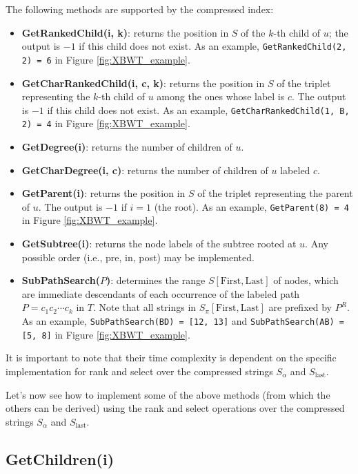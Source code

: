 The following methods are supported by the compressed index:
\begin{itemize}
    \item \textbf{GetRankedChild(i, k)}: returns the position in $S$ of the $k$-th child of $u$; the output is $-1$ if this child does not exist. As an example, \texttt{GetRankedChild(2, 2) = 6} in Figure \ref{fig:XBWT_example}.
    \item \textbf{GetCharRankedChild(i, c, k)}: returns the position in $S$ of the triplet representing the $k$-th child of $u$ among the ones whose label is $c$. The output is $-1$ if this child does not exist. As an example, \texttt{GetCharRankedChild(1, B, 2) = 4} in Figure \ref{fig:XBWT_example}.
    \item \textbf{GetDegree(i)}: returns the number of children of $u$.
    \item \textbf{GetCharDegree(i, c)}: returns the number of children of $u$ labeled $c$.
    \item \textbf{GetParent(i)}: returns the position in $S$ of the triplet representing the parent of $u$. The output is $-1$ if $i = 1$ (the root). As an example, \texttt{GetParent(8) = 4} in Figure \ref{fig:XBWT_example}.
    \item \textbf{GetSubtree(i)}: returns the node labels of the subtree rooted at $u$. Any possible order (i.e., pre, in, post) may be implemented.
    \item \textbf{SubPathSearch($P$)}: determines the range $S[\text{First}, \text{Last}]$ of nodes, which are immediate descendants of each occurrence of the labeled path $P = c_1c_2 \cdots c_k$ in $T$. Note that all strings in $S_{\pi}[\text{First}, \text{Last}]$ are prefixed by $P^R$. As an example, \texttt{SubPathSearch(BD) = [12, 13]} and \texttt{SubPathSearch(AB) = [5, 8]} in Figure \ref{fig:XBWT_example}.
\end{itemize}

It is important to note that their time complexity is dependent on the specific implementation for rank and select over the compressed strings $S_{\alpha}$ and $S_{\text{last}}$. 

Let's now see how to implement some of the above methods (from which the others can be derived) using the rank and select operations over the compressed strings $S_{\alpha}$ and $S_{\text{last}}$.

\subsection*{GetChildren(i)}


